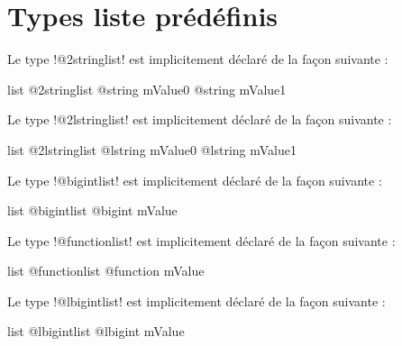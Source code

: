 \section{Types liste prédéfinis}


Le type \ggs!@2stringlist! est implicitement déclaré de la façon suivante :

\begin{galgasbox}
list @2stringlist {
  @string mValue0
  @string mValue1
}
\end{galgasbox}









Le type \ggs!@2lstringlist! est implicitement déclaré de la façon suivante :

\begin{galgasbox}
list @2lstringlist {
  @lstring mValue0
  @lstring mValue1
}
\end{galgasbox}









Le type \ggs!@bigintlist! est implicitement déclaré de la façon suivante :

\begin{galgasbox}
list @bigintlist {
  @bigint mValue
}
\end{galgasbox}









Le type \ggs!@functionlist! est implicitement déclaré de la façon suivante :

\begin{galgasbox}
list @functionlist {
  @function mValue
}
\end{galgasbox}









Le type \ggs!@lbigintlist! est implicitement déclaré de la façon suivante :

\begin{galgasbox}
list @lbigintlist {
  @lbigint mValue
}
\end{galgasbox}










